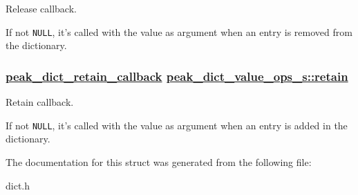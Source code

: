 Release callback. 

If not {\tt NULL}, it's called with the value as argument when an entry is removed from the dictionary. \hypertarget{structpeak__dict__value__ops__s_o0}{
\subsubsection[retain]{\setlength{\rightskip}{0pt plus 5cm}\hyperlink{group__dict_ga1}{peak\_\-dict\_\-retain\_\-callback} \hyperlink{structpeak__dict__value__ops__s_o0}{peak\_\-dict\_\-value\_\-ops\_\-s::retain}}}
\label{structpeak__dict__value__ops__s_o0}


Retain callback. 

If not {\tt NULL}, it's called with the value as argument when an entry is added in the dictionary. 

The documentation for this struct was generated from the following file:\begin{CompactItemize}
\item 
dict.h\end{CompactItemize}
